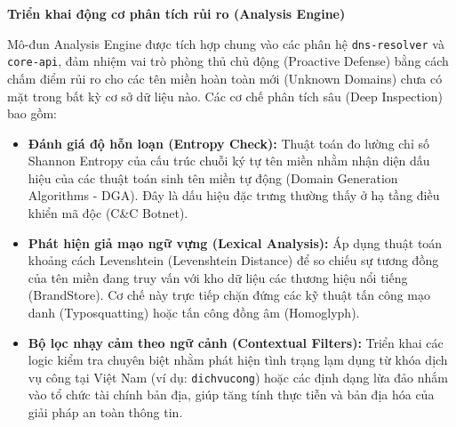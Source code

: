 \textbf{Triển khai động cơ phân tích rủi ro (Analysis Engine)}

Mô-đun Analysis Engine được tích hợp chung vào các phân hệ \texttt{dns-\-resolver} và \texttt{core-api}, đảm nhiệm vai trò phòng thủ chủ động (Proactive Defense) bằng cách chấm điểm rủi ro cho các tên miền hoàn toàn mới (Unknown Domains) chưa có mặt trong bất kỳ cơ sở dữ liệu nào. Các cơ chế phân tích sâu (Deep Inspection) bao gồm:
\begin{itemize}
    \item \textbf{Đánh giá độ hỗn loạn (Entropy Check):} Thuật toán đo lường chỉ số Shannon Entropy của cấu trúc chuỗi ký tự tên miền nhằm nhận diện dấu hiệu của các thuật toán sinh tên miền tự động (Domain Generation Algorithms - DGA). Đây là dấu hiệu đặc trưng thường thấy ở hạ tầng điều khiển mã độc (C\&C Botnet).
    \item \textbf{Phát hiện giả mạo ngữ vựng (Lexical Analysis):} Áp dụng thuật toán khoảng cách Levenshtein (Levenshtein Distance) để so chiếu sự tương đồng của tên miền đang truy vấn với kho dữ liệu các thương hiệu nổi tiếng (BrandStore). Cơ chế này trực tiếp chặn đứng các kỹ thuật tấn công mạo danh (Typosquatting) hoặc tấn công đồng âm (Homoglyph).
    \item \textbf{Bộ lọc nhạy cảm theo ngữ cảnh (Contextual Filters):} Triển khai các logic kiểm tra chuyên biệt nhằm phát hiện tình trạng lạm dụng từ khóa dịch vụ công tại Việt Nam (ví dụ: \texttt{dichvucong}) hoặc các định dạng lừa đảo nhắm vào tổ chức tài chính bản địa, giúp tăng tính thực tiễn và bản địa hóa của giải pháp an toàn thông tin.
\end{itemize}

